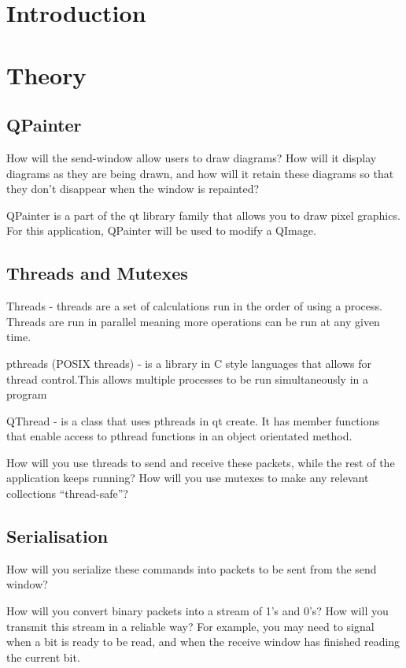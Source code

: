 \documentclass[10pt]{article}
\begin{document}
\begin{multicols*}{2}

\section{Introduction}

\section{Theory}
\subsection{QPainter}
How will the send-window allow users to draw diagrams? How will it display
diagrams as they are being drawn, and how will it retain these diagrams so
that they don’t disappear when the window is repainted?

QPainter is a part of the qt library family that allows you to draw pixel graphics. For this application, QPainter will be used to modify a QImage.

\subsection{Threads and Mutexes}
Threads - threads are a set of calculations run in the order of using a process. Threads are run in parallel meaning more operations can be run at any given time.

pthreads (POSIX threads) - is a library in C style languages that allows for thread control.This allows multiple processes to be run simultaneously in a program

QThread - is a class that uses pthreads in qt create. It has member functions that enable  access to pthread functions in an object orientated method. 


How will you use threads to send and receive these packets, while the rest of
the application keeps running? How will you use mutexes to make any relevant
collections “thread-safe”?

\subsection{Serialisation}
How will you serialize these commands into packets to be sent from the send
window?

How will you convert binary packets into a stream of 1’s and 0’s? How will you
transmit this stream in a reliable way? For example, you may need to signal
when a bit is ready to be read, and when the receive window has finished
reading the current bit.


\end{multicols*}
\end{document}
